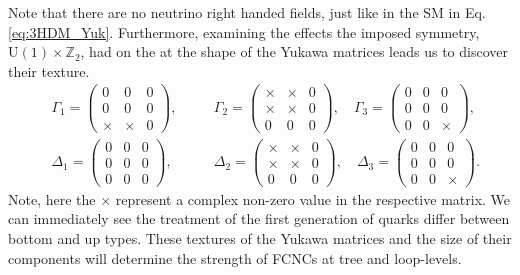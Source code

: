 Note that there are no neutrino right handed fields, just like in the SM in Eq. \ref{eq:3HDM_Yuk}. 
%
Furthermore, examining the effects the imposed symmetry, $\mathrm{U}(1)\times\mathbb{Z}_2$, had on the at the shape of the Yukawa matrices leads us to discover their texture. 
%
\begin{equation}
\begin{aligned}
&\Gamma_1  = \begin{pmatrix}
0 & 0 & 0\\
0 & 0 & 0\\
\times & \times & 0
\end{pmatrix}, \quad 
&&\Gamma_2  = \begin{pmatrix}
\times & \times & 0\\
\times & \times & 0\\
0 & 0 & 0
\end{pmatrix}, \quad
\Gamma_3  = \begin{pmatrix}
0 & 0 & 0\\
0 & 0 & 0\\
0 & 0 & \times
\end{pmatrix}, \\[1em]
&\Delta_1  = \begin{pmatrix}
0 & 0 & 0\\
0 & 0 & 0\\
0 & 0 & 0
\end{pmatrix}, \quad 
&&\Delta_2 = \begin{pmatrix}
\times & \times & 0\\
\times & \times & 0\\
0 & 0 & 0
\end{pmatrix} , \quad 
\Delta_3 = \begin{pmatrix}
0 & 0 & 0\\
0 & 0 & 0\\
0 & 0 & \times
\end{pmatrix}. 
\end{aligned} 
\end{equation}
Note, here the $\times$ represent a complex non-zero value in the respective matrix. 
%
We can immediately see the treatment of the first generation of quarks differ between bottom and up types. 
%
%
These textures of the Yukawa matrices and the size of their components will determine the strength of FCNCs at tree and loop-levels. 
%
